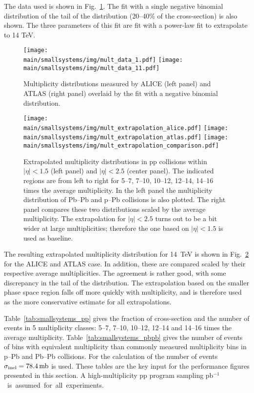 \documentclass[../report.tex]{subfiles}
\providecommand{\main}{..}
\begin{document}
The data used is shown in Fig.~\ref{fig:smallsystems_mult_data}. The fit with a single negative binomial distribution of the tail of the distribution (20--40\% of the cross-section) is also shown. The three parameters of this fit are fit with a power-law fit to extrapolate to 14 TeV.

\begin{figure}[ht]
\centering
\texttt{[image: \\main/smallsystems/img/mult\_data\_1.pdf]}
\hfill
\texttt{[image: \\main/smallsystems/img/mult\_data\_11.pdf]}
\caption{Multiplicity distributions measured by ALICE (left panel) and ATLAS (right panel) overlaid by the fit with a negative binomial distribution.}
\label{fig:smallsystems_mult_data}
\end{figure}

\begin{figure}[ht]
\centering
\texttt{[image: \\main/smallsystems/img/mult\_extrapolation\_alice.pdf]}
\texttt{[image: \\main/smallsystems/img/mult\_extrapolation\_atlas.pdf]}
\texttt{[image: \\main/smallsystems/img/mult\_extrapolation\_comparison.pdf]}
\caption{Extrapolated multiplicity distributions in pp collisions within $|\eta| < 1.5$ (left panel) and $|\eta| < 2.5$ (center panel). The indicated regions are from left to right for 5--7, 7--10, 10--12, 12--14, 14--16 times the average multiplicity. In the left panel the multiplicity distribution of Pb--Pb and p--Pb collisions is also plotted. The right panel compares these two distributions scaled by the average multiplicity. The extrapolation for $|\eta| < 2.5$ turns out to be a bit wider at large multiplicities; therefore the one based on $|\eta| < 1.5$ is used as baseline.}
\label{fig:smallsystems_mult_extrapolation}
\end{figure}

The resulting extrapolated multiplicity distribution for 14~TeV is shown in Fig.~\ref{fig:smallsystems_mult_extrapolation} for the ALICE and ATLAS case. In addition, these are compared scaled by their respective average multiplicities. The agreement is rather good, with some discrepancy in the tail of the distribution. The extrapolation based on the smaller phase space region falls off more quickly with multiplicity, and is therefore used as the more conservative estimate for all extrapolations.

Table~\ref{tab:smallsystems_pp} gives the fraction of cross-section and the number of events in 5 multiplicity classes:  5--7, 7--10, 10--12, 12--14 and 14--16 times the average multiplicity. Table~\ref{tab:smallsystems_pbpb} gives the number of events of bins with equivalent multiplicity than commonly measured multiplicity bins in p--Pb and Pb--Pb collisions. For the calculation of the number of events $\sigma_{\rm inel} = \unit[78.4]{mb}$ \cite{Loizides:2017ack} is used. These tables are the key input for the performance figures presented in this section. A high-multiplicity pp program sampling \unit[200]{pb$^{-1}$} is assumed for all experiments.
 
\end{document}

